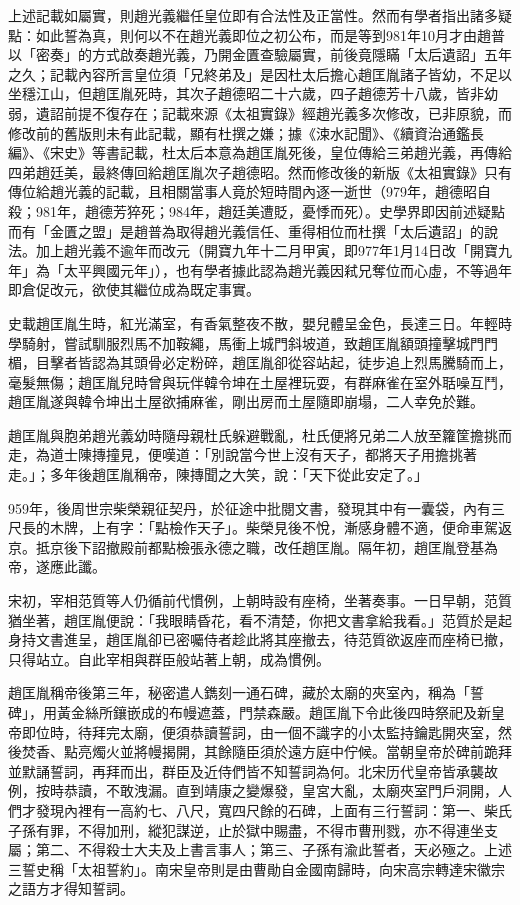 上述記載如屬實，則趙光義繼任皇位即有合法性及正當性。然而有學者指出諸多疑點：如此誓為真，則何以不在趙光義即位之初公布，而是等到981年10月才由趙普以「密奏」的方式啟奏趙光義，乃開金匱查驗屬實，前後竟隱瞞「太后遺詔」五年之久；記載內容所言皇位須「兄終弟及」是因杜太后擔心趙匡胤諸子皆幼，不足以坐穩江山，但趙匡胤死時，其次子趙德昭二十六歲，四子趙德芳十八歲，皆非幼弱，遺詔前提不復存在；記載來源《太祖實錄》經趙光義多次修改，已非原貌，而修改前的舊版則未有此記載，顯有杜撰之嫌；據《涑水記聞》、《續資治通鑑長編》、《宋史》等書記載，杜太后本意為趙匡胤死後，皇位傳給三弟趙光義，再傳給四弟趙廷美，最終傳回給趙匡胤次子趙德昭。然而修改後的新版《太祖實錄》只有傳位給趙光義的記載，且相關當事人竟於短時間內逐一逝世（979年，趙德昭自殺；981年，趙德芳猝死；984年，趙廷美遭貶，憂悸而死）。史學界即因前述疑點而有「金匱之盟」是趙普為取得趙光義信任、重得相位而杜撰「太后遺詔」的說法。加上趙光義不逾年而改元（開寶九年十二月甲寅，即977年1月14日改「開寶九年」為「太平興國元年」），也有學者據此認為趙光義因弒兄奪位而心虛，不等過年即倉促改元，欲使其繼位成為既定事實。

史載趙匡胤生時，紅光滿室，有香氣整夜不散，嬰兒體呈金色，長達三日。年輕時學騎射，嘗試馴服烈馬不加鞍繩，馬衝上城門斜坡道，致趙匡胤額頭撞擊城門門楣，目擊者皆認為其頭骨必定粉碎，趙匡胤卻從容站起，徒步追上烈馬騰騎而上，毫髮無傷；趙匡胤兒時曾與玩伴韓令坤在土屋裡玩耍，有群麻雀在室外聒噪互鬥，趙匡胤遂與韓令坤出土屋欲捕麻雀，剛出房而土屋隨即崩塌，二人幸免於難。

趙匡胤與胞弟趙光義幼時隨母親杜氏躲避戰亂，杜氏便將兄弟二人放至籮筐擔挑而走，為道士陳摶撞見，便嘆道：「別說當今世上沒有天子，都將天子用擔挑著走。」；多年後趙匡胤稱帝，陳摶聞之大笑，說：「天下從此安定了。」

959年，後周世宗柴榮親征契丹，於征途中批閱文書，發現其中有一囊袋，內有三尺長的木牌，上有字：「點檢作天子」。柴榮見後不悅，漸感身體不適，便命車駕返京。抵京後下詔撤殿前都點檢張永德之職，改任趙匡胤。隔年初，趙匡胤登基為帝，遂應此讖。

宋初，宰相范質等人仍循前代慣例，上朝時設有座椅，坐著奏事。一日早朝，范質猶坐著，趙匡胤便說：「我眼睛昏花，看不清楚，你把文書拿給我看。」范質於是起身持文書進呈，趙匡胤卻已密囑侍者趁此將其座撤去，待范質欲返座而座椅已撤，只得站立。自此宰相與群臣般站著上朝，成為慣例。

趙匡胤稱帝後第三年，秘密遣人鐫刻一通石碑，藏於太廟的夾室內，稱為「誓碑」，用黃金絲所鑲嵌成的布幔遮蓋，門禁森嚴。趙匡胤下令此後四時祭祀及新皇帝即位時，待拜完太廟，便須恭讀誓詞，由一個不識字的小太監持鑰匙開夾室，然後焚香、點亮燭火並將幔揭開，其餘隨臣須於遠方庭中佇候。當朝皇帝於碑前跪拜並默誦誓詞，再拜而出，群臣及近侍們皆不知誓詞為何。北宋历代皇帝皆承襲故例，按時恭讀，不敢洩漏。直到靖康之變爆發，皇宮大亂，太廟夾室門戶洞開，人們才發現內裡有一高約七、八尺，寬四尺餘的石碑，上面有三行誓詞：第一、柴氏子孫有罪，不得加刑，縱犯謀逆，止於獄中賜盡，不得市曹刑戮，亦不得連坐支屬；第二、不得殺士大夫及上書言事人；第三、子孫有渝此誓者，天必殛之。上述三誓史稱「太祖誓約」。南宋皇帝則是由曹勛自金國南歸時，向宋高宗轉達宋徽宗之語方才得知誓詞。


